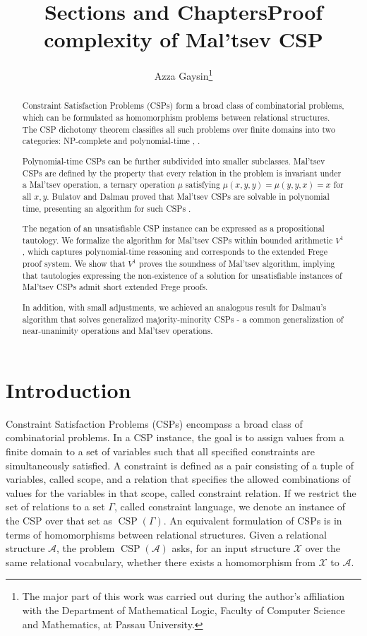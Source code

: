 \documentclass{article}
\title{Sections and Chapters}
\title{Proof complexity of Mal'tsev CSP}
\author{Azza Gaysin\thanks{The major part of this work was carried out during the author's affiliation with the Department of Mathematical Logic, Faculty of Computer Science and Mathematics, at Passau University.}}
\date{}
\theoremstyle{definition}
\theoremstyle{theorem}
\theoremstyle{theorem}
\theoremstyle{remark}
\theoremstyle{remark}
\theoremstyle{example}
\theoremstyle{notation}
\theoremstyle{theorem}
\begin{document}
\allowdisplaybreaks
\maketitle
\begin{abstract}
Constraint Satisfaction Problems (CSPs) form a broad class of combinatorial problems, which can be formulated as homomorphism problems between relational structures. The CSP dichotomy theorem classifies all such problems over finite domains into two categories: NP-complete and polynomial-time \cite{8104069}, \cite{10.1145/3402029}.

Polynomial-time CSPs can be further subdivided into smaller subclasses. Mal'tsev CSPs are defined by the property that every relation in the problem is invariant under a Mal’tsev operation, a ternary operation $\mu$ satisfying $\mu(x, y, y) = \mu(y, y, x) = x$ for all $x, y$. Bulatov and Dalmau proved that Mal'tsev CSPs are solvable in polynomial time, presenting an algorithm for such CSPs \cite{articlestdfh}. 

The negation of an unsatisfiable CSP instance can be expressed as a propositional tautology. We formalize the algorithm for Mal'tsev CSPs within bounded arithmetic $V^1$, which captures polynomial-time reasoning and corresponds to the extended Frege proof system. We show that $V^1$ proves the soundness of Mal'tsev algorithm, implying that tautologies expressing the non-existence of a solution for unsatisfiable instances of Mal'tsev CSPs admit short extended Frege proofs. 

In addition, with small adjustments, we achieved an analogous result for Dalmau's algorithm that solves generalized majority-minority CSPs - a common generalization of near-unanimity operations and Mal’tsev operations.



\end{abstract}


\section{Introduction}

Constraint Satisfaction Problems (CSPs) encompass a broad class of combinatorial problems. In a CSP instance, the goal is to assign values from a finite domain to a set of variables such that all specified constraints are simultaneously satisfied. A constraint is defined as a pair consisting of a tuple of variables, called scope, and a relation that specifies the allowed combinations of values for the variables in that scope, called constraint relation. If we restrict the set of relations to a set $\Gamma$, called constraint language, we denote an instance of the CSP over that set as $\operatorname{CSP}(\Gamma)$. An equivalent formulation of CSPs is in terms of homomorphisms between relational structures. Given a relational structure $\mathcal{A}$, the problem $\operatorname{CSP}(\mathcal{A})$ asks, for an input structure $\mathcal{X}$ over the same relational vocabulary, whether there exists a homomorphism from $\mathcal{X}$ to $\mathcal{A}$.
\end{document}
